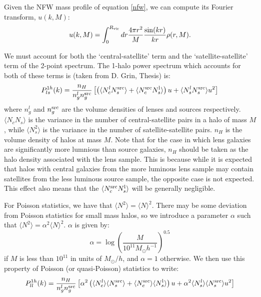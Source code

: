 \documentclass[onecolumn,amsmath,aps,fleqn, superscriptaddress]{revtex4}
\begin{document}
Given the NFW mass profile of equation \ref{nfw}, we can compute its Fourier transform, $u(k, M)$:
\begin{equation}
u(k, M) = \int_0^{R_{\rm vir}} dr \frac{4 \pi r^2}{M}\frac{\sin(kr)}{kr}\rho(r, M).
\label{u}
\end{equation}

We must account for both the `central-satellite' term and the `satellite-satellite' term of the 2-point spectrum. The 1-halo power spectrum which accounts for both of these terms is (taken from D. Grin, Thesis) is:
\begin{equation}
P_{ls}^{1h}(k) = \frac{n_H}{n_g^l n_g^{\rm src}}\left[\left(\langle N_c^l N_s^{\rm src} \rangle + \langle N_c^{\rm src} N_s^{\rm l} \rangle \right) u + \langle N_s^l N_s^{\rm src} \rangle u^2\right]
\label{1hpgg}
\end{equation}
where $n_g^l$ and $n_g^{\rm src}$ are the volume densities of lenses and sources respectively. $\langle N_c N_s \rangle$ is the variance in the number of central-satellite pairs in a halo of mass $M$, while $\langle N_s^2 \rangle$ is the variance in the number of satellite-satellite pairs. $n_H$ is the volume density of halos at mass $M$. Note that for the case in which lens galaxies are significantly more lumnious than source galaxies, $n_H$ should be taken as the halo density associated with the lens sample. This is because while it is expected that halos with central galaxies from the more luminous lens sample may contain satellites from the less luminous source sample, the opposite case is not expected. This effect also means that the $\langle N_c^{\rm src} N_s^{\rm l} \rangle$ will be generally negligible.

For Poisson statistics, we have that $\langle N^2 \rangle = \langle N \rangle^2$. There may be some deviation from Poisson statistics for small mass halos, so we introduce a parameter $\alpha$ such that $\langle N^2 \rangle = \alpha^2\langle N \rangle^2$. $\alpha$ is given by:
\begin{equation}
\alpha = \log\left(\frac{M}{10^{11}M_\odot h^{-1}}\right)^{0.5}
\label{alpha}
\end{equation}
if $M$ is less than $10^{11}$ in units of $M_\odot / h$, and $\alpha=1$ otherwise. We then use this property of Poisson (or quasi-Poisson) statistics to write:
\begin{equation}
P_{ll}^{1h}(k) = \frac{n_H}{n_g^l n_g^{\rm src}}\left[\alpha^2 \left(\langle N_c^l \rangle \langle N_s^{\rm src} \rangle + \langle N_c^{\rm src}\rangle \langle N_s^{\rm l} \rangle\right) u + \alpha^2\langle N_s^l \rangle \langle N_s^{\rm src} \rangle u^2\right]
\label{1hpgg_Pois}
\end{equation}
\end{document}
